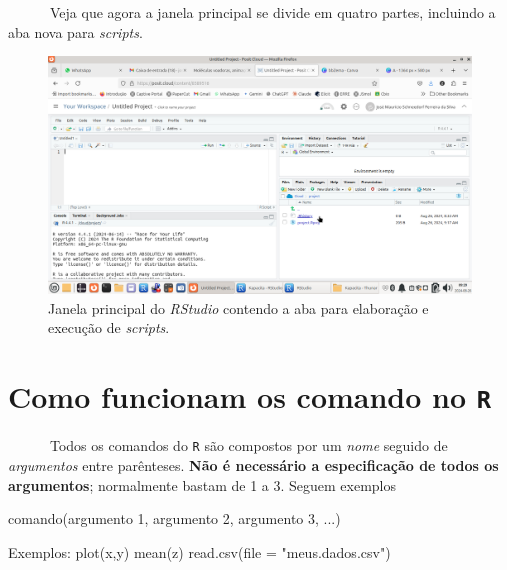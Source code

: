 \documentclass[
  letterpaper,
  DIV=11,
  numbers=noendperiod]{scrreprt}
\newenvironment{Shaded}{\begin{snugshade}}{\end{snugshade}}
\newcommand{\AttributeTok}[1]{\textcolor[rgb]{0.40,0.45,0.13}{#1}}
\newcommand{\DecValTok}[1]{\textcolor[rgb]{0.68,0.00,0.00}{#1}}
\newcommand{\FunctionTok}[1]{\textcolor[rgb]{0.28,0.35,0.67}{#1}}
\newcommand{\NormalTok}[1]{\textcolor[rgb]{0.00,0.23,0.31}{#1}}
\newcommand{\SpecialCharTok}[1]{\textcolor[rgb]{0.37,0.37,0.37}{#1}}
\newcommand{\StringTok}[1]{\textcolor[rgb]{0.13,0.47,0.30}{#1}}
\begin{document}
~~~~~~Veja que agora a janela principal se divide em quatro partes,
incluindo a aba nova para \emph{scripts}.

\begin{figure}[H]

{\centering \includegraphics{rstudioScriptAberta.png}

}

\caption{Janela principal do \emph{RStudio} contendo a aba para
elaboração e execução de \emph{scripts}.}

\end{figure}%

\section{\texorpdfstring{Como funcionam os comando no
\texttt{R}}{Como funcionam os comando no R}}\label{como-funcionam-os-comando-no-r}

~~~~~~Todos os comandos do \texttt{R} são compostos por um \emph{nome}
seguido de \emph{argumentos} entre parênteses. \textbf{Não é necessário
a especificação de todos os argumentos}; normalmente bastam de 1 a 3.
Seguem exemplos

\begin{Shaded}
\begin{Highlighting}[]
\FunctionTok{comando}\NormalTok{(argumento }\DecValTok{1}\NormalTok{, argumento }\DecValTok{2}\NormalTok{, argumento }\DecValTok{3}\NormalTok{, ...)}

\NormalTok{Exemplos}\SpecialCharTok{:}
  \FunctionTok{plot}\NormalTok{(x,y)}
  \FunctionTok{mean}\NormalTok{(z)}
  \FunctionTok{read.csv}\NormalTok{(}\AttributeTok{file =} \StringTok{"meus.dados.csv"}\NormalTok{)}
\end{Highlighting}
\end{Shaded}
\end{document}
